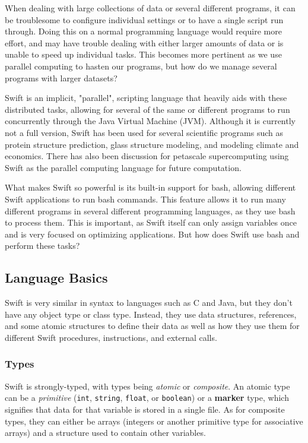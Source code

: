 \swiftColor
When dealing with large collections of data or several different programs, it can be troublesome to configure individual settings or to have a single script run through. Doing this on a normal programming language would require more effort, and may have trouble dealing with either larger amounts of data or is unable to speed up individual tasks. This becomes more pertinent as we use parallel computing to hasten our programs, but how do we manage several programs with larger datasets?

Swift is an implicit, "parallel", scripting language that heavily aids with these distributed tasks, allowing for several of the same or different programs to run concurrently through the Java Virtual Machine (JVM). Although it is currently not a full version, Swift has been used for several scientific programs such as protein structure prediction, glass structure modeling, and modeling climate and economics. There has also been discussion for petascale supercomputing using Swift as the parallel computing language \cite{wilde2009parallel} for future computation.

What makes Swift so powerful is its built-in support for bash, allowing different Swift applications to run bash commands. This feature allows it to run many different programs in several different programming languages, as they use bash to process them. This is important, as Swift itself can only assign variables once and is very focused on optimizing applications. But how does Swift use bash and perform these tasks?

\subsection{Language Basics}
    Swift is very similar in syntax to languages such as C and Java, but they don't have any object type or class type. Instead, they use data structures, references, and some atomic structures to define their data as well as how they use them for different Swift procedures, instructions, and external calls. \cite{website:swift-lang-user-guide}

    \subsubsection{Types}
        Swift is strongly-typed, with types being \textit{atomic} or \textit{composite}. An atomic type can be a \textit{primitive} (\texttt{int}, \texttt{string}, \texttt{float}, or \texttt{boolean}) or a \textbf{marker} type, which signifies that data for that variable is stored in a single file. As for composite types, they can either be arrays (integers or another primitive type for associative arrays) and a structure used to contain other variables.

